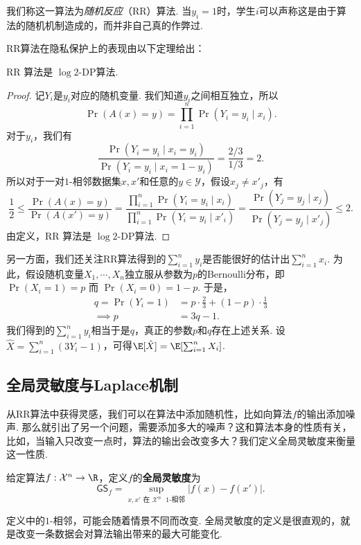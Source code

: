 我们称这一算法为\emph{随机反应}（RR）算法. 当$y_i = 1$时，学生$i$可以声称这是由于算法的随机机制造成的，而并非自己真的作弊过.

RR算法在隐私保护上的表现由以下定理给出：
\begin{theorem}
    RR 算法是 $\log 2$-DP算法.
\end{theorem}
\begin{proof}
记$Y_i$是$y_i$对应的随机变量. 我们知道$y_i$之间相互独立，所以
    \[
    \Pr(A(x) = y) = \prod_{i=1}^n \Pr(Y_i = y_i \mid x_i).
    \]
对于$y_i$，我们有
    \[
    \frac{\Pr(Y_i = y_i \mid x_i = y_i)}{\Pr(Y_i = y_i \mid x_i = 1 - y_i)} = \frac{2/3}{1/3} = 2.
    \]
所以对于一对$1$-相邻数据集$x, x'$和任意的$y \in \mathcal Y$，假设$x_j \neq x'_j$，有
    \[
    \frac12 \leq \frac{\Pr(A(x) = y)}{\Pr(A(x') = y)} = \frac{\prod_{i=1}^n \Pr(Y_i = y_i \mid x_i)}{\prod_{i=1}^n \Pr(Y_i = y_i \mid x'_i)} = \frac{\Pr(Y_j = y_j \mid x_j)}{\Pr(Y_j = y_j \mid x'_j)} \leq 2.
    \]
由定义，RR 算法是 $\log 2$-DP算法.
\end{proof}

另一方面，我们还关注RR算法得到的$\sum_{i=1}^n y_i$是否能很好的估计出$\sum_{i=1}^n x_i$. 为此，假设随机变量$X_1, \cdots, X_n$独立服从参数为$p$的Bernoulli分布，即 $\Pr(X_i=1) =p$ 而 $\Pr(X_i=0)= 1-p$. 于是，
\[\begin{aligned}
    q = \Pr(Y_i = 1) &= p \cdot \frac23 + (1 - p) \cdot \frac13 \\
    \implies p &= 3 q - 1.   
\end{aligned}\]
我们得到的$\sum_{i=1}^n y_i$相当于是$q$，真正的参数$p$和$q$存在上述关系. 设$\hat{X} = \sum_{i=1}^n (3 Y_i - 1)$，可得$\E[\hat{X}] = \E[\sum_{i=1}^n X_i]$.

\subsection{全局灵敏度与Laplace机制}
从RR算法中获得灵感，我们可以在算法中添加随机性，比如向算法$f$的输出添加噪声. 那么就引出了另一个问题，需要添加多大的噪声？这和算法本身的性质有关，比如，当输入只改变一点时，算法的输出会改变多大？我们定义全局灵敏度来衡量这一性质.

\begin{definition}[全局灵敏度]
给定算法$f: \mathcal X^n \to \R$，定义$f$的\textbf{全局灵敏度}为
    \[
    \mathsf{GS}_f = \sup_{x, x' \text{ 在 }\mathcal X^n\text{ $1$-相邻}} |f(x) - f(x')|. 
    \]
\end{definition}
定义中的$1$-相邻，可能会随着情景不同而改变. 全局灵敏度的定义是很直观的，就是改变一条数据会对算法输出带来的最大可能变化. 

